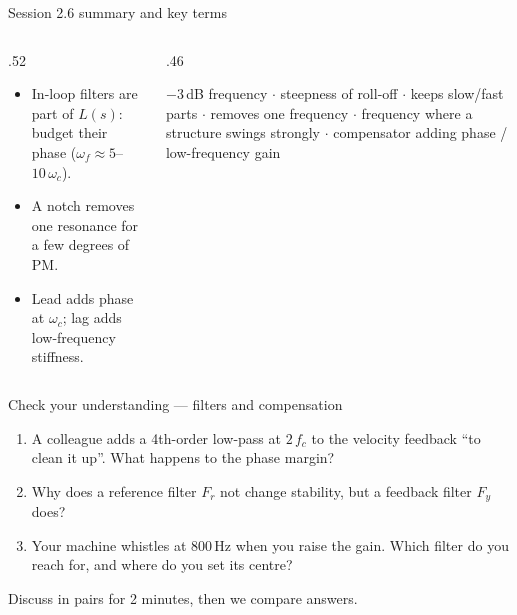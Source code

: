 \documentclass[aspectratio=169,10pt]{beamer}
\begin{document}
\begin{frame}{Session 2.6 summary and key terms}
\begin{columns}[T]
\begin{column}{.52\textwidth}
\begin{keybox}
\begin{itemize}\setlength\itemsep{.3mm}
\item In-loop filters are part of $L(s)$: budget their phase ($\omega_f\approx5$--$10\,\omega_c$).
\item A notch removes one resonance for a few degrees of PM.
\item Lead adds phase at $\omega_c$; lag adds low-frequency stiffness.
\end{itemize}
\end{keybox}
\end{column}
\begin{column}{.46\textwidth}
\begin{defbox}
\small
{} $-3$\,dB frequency $\cdot$  steepness of roll-off $\cdot$  keeps slow/fast parts $\cdot$  removes one frequency $\cdot$  frequency where a structure swings strongly $\cdot$  compensator adding phase / low-frequency gain
\end{defbox}
\end{column}
\end{columns}
\end{frame}

\begin{frame}{Check your understanding --- filters and compensation}
\begin{keybox}
\begin{enumerate}\setlength\itemsep{2mm}
\item A colleague adds a 4th-order low-pass at $2\,f_c$ to the velocity feedback ``to clean it up''. What happens to the phase margin?
\item Why does a reference filter $F_r$ not change stability, but a feedback filter $F_y$ does?
\item Your machine whistles at 800\,Hz when you raise the gain. Which filter do you reach for, and where do you set its centre?
\end{enumerate}
\end{keybox}
\vspace{2mm}
{\small\color{mkGray}Discuss in pairs for 2 minutes, then we compare answers.}
\end{frame}
\end{document}
